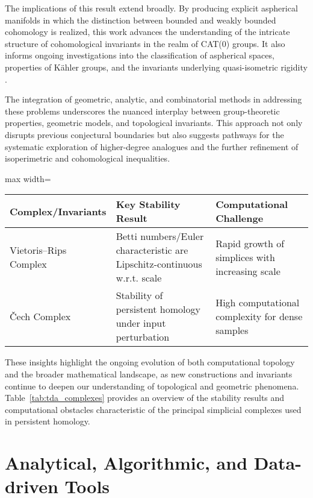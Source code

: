 The implications of this result extend broadly. By producing explicit aspherical manifolds in which the distinction between bounded and weakly bounded cohomology is realized, this work advances the understanding of the intricate structure of cohomological invariants in the realm of CAT(0) groups. It also informs ongoing investigations into the classification of aspherical spaces, properties of Kähler groups, and the invariants underlying quasi-isometric rigidity \cite{ref84}. 

The integration of geometric, analytic, and combinatorial methods in addressing these problems underscores the nuanced interplay between group-theoretic properties, geometric models, and topological invariants. This approach not only disrupts previous conjectural boundaries but also suggests pathways for the systematic exploration of higher-degree analogues and the further refinement of isoperimetric and cohomological inequalities. 

\begin{table*}[htbp]
\centering
\caption{Summary of Key Properties and Computational Challenges of Vietoris--Rips and Čech Complexes}
\label{tab:tda_complexes}
\begin{adjustbox}{max width=\textwidth}
\begin{tabular}{lll}
\toprule
\textbf{Complex/Invariants} & \textbf{Key Stability Result} & \textbf{Computational Challenge} \\
\midrule
Vietoris--Rips Complex      & Betti numbers/Euler characteristic are Lipschitz-continuous w.r.t. scale & Rapid growth of simplices with increasing scale \\
Čech Complex                & Stability of persistent homology under input perturbation & High computational complexity for dense samples \\
\bottomrule
\end{tabular}
\end{adjustbox}
\end{table*}

These insights highlight the ongoing evolution of both computational topology and the broader mathematical landscape, as new constructions and invariants continue to deepen our understanding of topological and geometric phenomena. Table~\ref{tab:tda_complexes} provides an overview of the stability results and computational obstacles characteristic of the principal simplicial complexes used in persistent homology.

\section{Analytical, Algorithmic, and Data-driven Tools}

